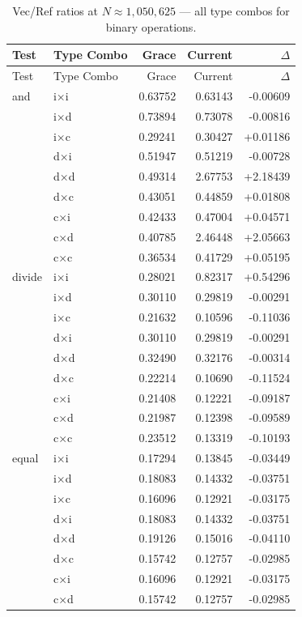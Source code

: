\begin{longtable}{l l r r r}
\caption{Vec/Ref ratios at $N \approx 1{,}050{,}625$ — all type combos for binary operations.}
\label{tab:ratio-binary-full} \\
\toprule
Test & Type Combo & Grace & Current & $\Delta$ \\
\midrule
\endfirsthead
\toprule
Test & Type Combo & Grace & Current & $\Delta$ \\
\midrule
\endhead
  and & i×i & 0.63752 & 0.63143 & -0.00609 \\
   & i×d & 0.73894 & 0.73078 & -0.00816 \\
   & i×c & 0.29241 & 0.30427 & +0.01186 \\
   & d×i & 0.51947 & 0.51219 & -0.00728 \\
   & d×d & 0.49314 & 2.67753 & +2.18439 \\
   & d×c & 0.43051 & 0.44859 & +0.01808 \\
   & c×i & 0.42433 & 0.47004 & +0.04571 \\
   & c×d & 0.40785 & 2.46448 & +2.05663 \\
   & c×c & 0.36534 & 0.41729 & +0.05195 \\
\midrule
  divide & i×i & 0.28021 & 0.82317 & +0.54296 \\
   & i×d & 0.30110 & 0.29819 & -0.00291 \\
   & i×c & 0.21632 & 0.10596 & -0.11036 \\
   & d×i & 0.30110 & 0.29819 & -0.00291 \\
   & d×d & 0.32490 & 0.32176 & -0.00314 \\
   & d×c & 0.22214 & 0.10690 & -0.11524 \\
   & c×i & 0.21408 & 0.12221 & -0.09187 \\
   & c×d & 0.21987 & 0.12398 & -0.09589 \\
   & c×c & 0.23512 & 0.13319 & -0.10193 \\
\midrule
  equal & i×i & 0.17294 & 0.13845 & -0.03449 \\
   & i×d & 0.18083 & 0.14332 & -0.03751 \\
   & i×c & 0.16096 & 0.12921 & -0.03175 \\
   & d×i & 0.18083 & 0.14332 & -0.03751 \\
   & d×d & 0.19126 & 0.15016 & -0.04110 \\
   & d×c & 0.15742 & 0.12757 & -0.02985 \\
   & c×i & 0.16096 & 0.12921 & -0.03175 \\
   & c×d & 0.15742 & 0.12757 & -0.02985 \\

\end{longtable}
